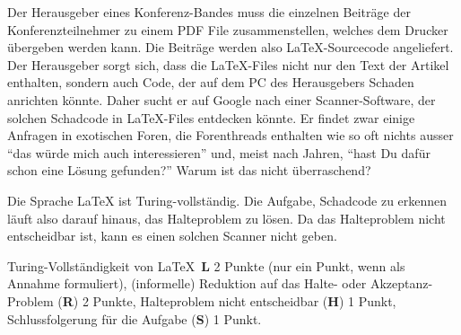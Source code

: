 Der Herausgeber eines Konferenz-Bandes muss die einzelnen Beiträge der 
Konferenzteilnehmer zu einem PDF File zusammenstellen, welches dem Drucker
übergeben werden kann.
Die Beiträge werden also \LaTeX-Sourcecode angeliefert.
Der Herausgeber sorgt sich, dass die \LaTeX-Files nicht nur den Text
der Artikel enthalten, sondern auch Code, der auf dem PC des Herausgebers
Schaden anrichten könnte.
Daher sucht er auf Google nach einer Scanner-Software, der solchen Schadcode  in
\LaTeX-Files entdecken könnte.
Er findet zwar einige Anfragen in exotischen Foren, die Forenthreads
enthalten wie so oft nichts ausser ``das würde mich auch interessieren'' und,
meist nach Jahren, ``hast Du dafür schon eine Lösung gefunden?''
Warum ist das nicht überraschend?


\begin{loesung}
Die Sprache \LaTeX{} ist Turing-vollständig.
Die Aufgabe, Schadcode zu erkennen läuft also darauf hinaus, das Halteproblem
zu lösen.
Da das Halteproblem nicht entscheidbar ist, kann es einen solchen Scanner
nicht geben.
\end{loesung}

\begin{bewertung}
Turing-Vollständigkeit von \LaTeX~{\bf L} 2 Punkte (nur ein Punkt, wenn
als Annahme formuliert),
(informelle) Reduktion auf das Halte- oder Akzeptanz-Problem ({\bf R}) 2 Punkte,
Halteproblem nicht entscheidbar ({\bf H}) 1 Punkt,
Schlussfolgerung für die Aufgabe ({\bf S}) 1 Punkt.
\end{bewertung}

